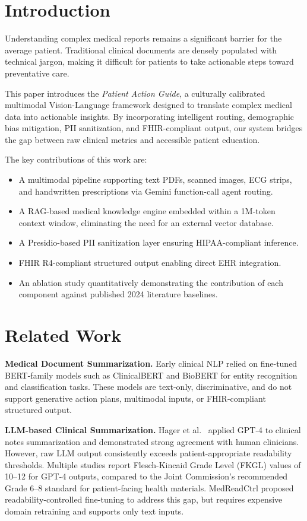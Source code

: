 \documentclass[conference]{IEEEtran}
\begin{document}
\section{Introduction}
Understanding complex medical reports remains a significant barrier for the average patient. Traditional clinical documents are densely populated with technical jargon, making it difficult for patients to take actionable steps toward preventative care.

This paper introduces the \textit{Patient Action Guide}, a culturally calibrated multimodal Vision-Language framework designed to translate complex medical data into actionable insights. By incorporating intelligent routing, demographic bias mitigation, PII sanitization, and FHIR-compliant output, our system bridges the gap between raw clinical metrics and accessible patient education.

The key contributions of this work are:
\begin{itemize}
    \item A multimodal pipeline supporting text PDFs, scanned images, ECG strips, and handwritten prescriptions via Gemini function-call agent routing.
    \item A RAG-based medical knowledge engine embedded within a 1M-token context window, eliminating the need for an external vector database.
    \item A Presidio-based PII sanitization layer ensuring HIPAA-compliant inference.
    \item FHIR R4-compliant structured output enabling direct EHR integration.
    \item An ablation study quantitatively demonstrating the contribution of each component against published 2024 literature baselines.
\end{itemize}

\section{Related Work}

\textbf{Medical Document Summarization.}
Early clinical NLP relied on fine-tuned BERT-family models such as ClinicalBERT \cite{huang2019clinicalbert}
and BioBERT \cite{lee2020biobert} for entity recognition and classification tasks.
These models are text-only, discriminative, and do not support generative action
plans, multimodal inputs, or FHIR-compliant structured output.

\textbf{LLM-based Clinical Summarization.}
Hager et al.\ \cite{hager2024gpt4clinical} applied GPT-4 to clinical notes
summarization and demonstrated strong agreement with human clinicians.
However, raw LLM output consistently exceeds patient-appropriate readability
thresholds. Multiple studies \cite{jmir2024readability} report Flesch-Kincaid
Grade Level (FKGL) values of 10--12 for GPT-4 outputs, compared to the Joint
Commission's recommended Grade 6--8 standard for patient-facing health materials.
MedReadCtrl \cite{medreadctrl2024} proposed readability-controlled fine-tuning
to address this gap, but requires expensive domain retraining and supports only
text inputs.
\end{document}
